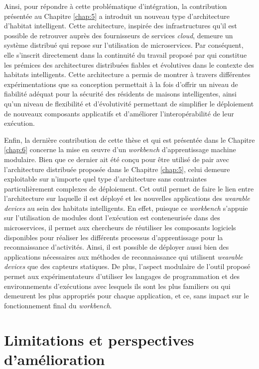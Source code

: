Ainsi, pour répondre à cette problématique d'intégration, la contribution présentée au Chapitre \ref{chap:5} a introduit un nouveau type d'architecture d'habitat intelligent. Cette architecture, inspirée des infrastructures qu'il est possible de retrouver auprès des fournisseurs de services \textit{cloud}, demeure un système distribué qui repose sur l'utilisation de microservices. Par conséquent,  elle s'inscrit directement dans la continuité du travail proposé par \cite{Plantevin2018} qui constitue les prémices des architectures distribuées fiables et évolutives dans le contexte des habitats intelligents. Cette architecture a permis de montrer à travers différentes expérimentations que sa conception permettait à la fois d'offrir un niveau de fiabilité adéquat pour la sécurité des résidents de maisons intelligentes, ainsi qu'un niveau de flexibilité et d'évolutivité permettant de simplifier le déploiement de nouveaux composants applicatifs et d'améliorer l'interopérabilité de leur exécution.

Enfin, la dernière contribution de cette thèse et qui est présentée dans le Chapitre \ref{chap:6} concerne la mise en \oe{}uvre d'un \textit{workbench} d'apprentissage machine modulaire. Bien que ce dernier ait été conçu pour être utilisé de pair avec l'architecture distribuée proposée dans le Chapitre \ref{chap:5}, celui demeure exploitable sur n'importe quel type d'architecture sans contraintes particulièrement complexes de déploiement. Cet outil permet de faire le lien entre l'architecture sur laquelle il est déployé et les nouvelles applications des \textit{wearable devices} au sein des habitats intelligents. En effet, puisque ce \textit{workbench} s'appuie sur l'utilisation de modules dont l'exécution est conteneurisée dans des microservices, il permet aux chercheurs de réutiliser les composants logiciels disponibles pour réaliser les différents processus d'apprentissage pour la reconnaissance d'activités. Ainsi, il est possible de déployer aussi bien des applications nécessaires aux méthodes de reconnaissance qui utilisent \textit{wearable devices} que des capteurs statiques. De plus, l'aspect modulaire de l'outil proposé permet aux expérimentateurs d'utiliser les langages de programmation et des environnements d'exécutions avec lesquels ils sont les plus familiers ou qui demeurent les plus appropriés pour chaque application, et ce, sans impact sur le fonctionnement final du \textit{workbench}.

\section{Limitations et perspectives d'amélioration}

